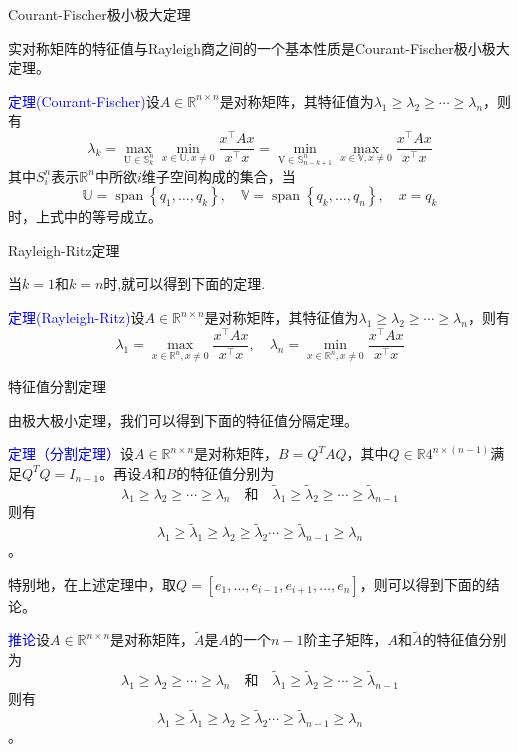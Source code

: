 \documentclass[12pt,a4paper]{article}
\begin{document}
Courant-Fischer极小极大定理

实对称矩阵的特征值与Rayleigh商之间的一个基本性质是Courant-Fischer极小极大定理。

\textcolor{blue}{定理(Courant-Fischer)}\quad 设$A \in \mathbb{R}^{n \times n}$是对称矩阵，其特征值为$\lambda_{1} \geq \lambda_{2} \geq \cdots \geq \lambda_{n}$，则有$$
\lambda_{k}=\max _{\mathrm{U} \in \mathbb{S}_{k}^{n}} \min _{x \in \mathbb{U}, x \neq 0} \frac{x^{\top} A x}{x^{\top} x}
 =\min _{\mathrm{V} \in \mathbb{S}_{n-k+1}^{n}} \max _{x \in \mathbb{V}, x \neq 0} \frac{x^{\top} A x}{x^{\top} x}
$$
其中$S_{i}^{n}$表示$\mathbb{R}^{n}$中所欲$i$维子空间构成的集合，当$$
\mathbb{U}=\operatorname{span}\left\{q_{1}, \ldots, q_{k}\right\}, \quad \mathbb{V}=\operatorname{span}\left\{q_{k}, \ldots, q_{n}\right\}, \quad x=q_{k}
$$时，上式中的等号成立。

Rayleigh-Ritz定理

当$k= 1$和$k=n$时,就可以得到下面的定理.

\textcolor{blue}{定理(Rayleigh-Ritz)}\quad 设$A \in \mathbb{R}^{n \times n}$是对称矩阵，其特征值为$\lambda_{1} \geq \lambda_{2} \geq \cdots \geq \lambda_{n}$，则有$$
\lambda_{1}=\max _{x \in \mathbb{R}^{n}, x \neq 0} \frac{x^{\top} A x}{x^{\top} x}, \quad \lambda_{n}=\min _{x \in \mathbb{R}^{n}, x \neq 0} \frac{x^{\top} A x}{x^{\top} x}
$$

特征值分割定理

由极大极小定理，我们可以得到下面的特征值分隔定理。

\textcolor{blue}{定理（分割定理）}\quad 设$A \in \mathbb{R}^{n \times n}$是对称矩阵，$B=Q^TAQ$，其中$Q\in \mathbb{R}4^{n \times (n-1)}$满足$Q^TQ=I_{n-1}$。再设$A$和$B$的特征值分别为$$
\lambda_{1} \geq \lambda_{2} \geq \cdots \geq \lambda_{n} \quad \textbf{和}  \quad \tilde{\lambda}_{1} \geq \tilde{\lambda}_{2} \geq \cdots \geq \tilde{\lambda}_{n-1}
$$则有$$
\lambda_{1} \geq \tilde{\lambda}_{1} \geq \lambda_{2} \geq \tilde{\lambda}_{2} \cdots \geq \tilde{\lambda}_{n-1} \geq \lambda_{n}
$$。

特别地，在上述定理中，取$Q=\left[e_{1}, \ldots, e_{i-1}, e_{i+1}, \dots, e_{n}\right]$，则可以得到下面的结论。

\textcolor{blue}{推论}\quad 设$A \in \mathbb{R}^{n \times n}$是对称矩阵，$\tilde{A}$是$A$的一个$n-1$阶主子矩阵，$A$和$\tilde{A}$的特征值分别为$$
\lambda_{1} \geq \lambda_{2} \geq \cdots \geq \lambda_{n} \quad \textbf{和}  \quad \tilde{\lambda}_{1} \geq \tilde{\lambda}_{2} \geq \cdots \geq \tilde{\lambda}_{n-1}
$$则有$$
\lambda_{1} \geq \tilde{\lambda}_{1} \geq \lambda_{2} \geq \tilde{\lambda}_{2} \cdots \geq \tilde{\lambda}_{n-1} \geq \lambda_{n}
$$。
\end{document}
